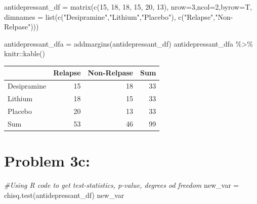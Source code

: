 \documentclass[
]{article}
\newenvironment{Shaded}{\begin{snugshade}}{\end{snugshade}}
\newcommand{\AttributeTok}[1]{\textcolor[rgb]{0.77,0.63,0.00}{#1}}
\newcommand{\CommentTok}[1]{\textcolor[rgb]{0.56,0.35,0.01}{\textit{#1}}}
\newcommand{\DecValTok}[1]{\textcolor[rgb]{0.00,0.00,0.81}{#1}}
\newcommand{\FunctionTok}[1]{\textcolor[rgb]{0.00,0.00,0.00}{#1}}
\newcommand{\NormalTok}[1]{#1}
\newcommand{\OtherTok}[1]{\textcolor[rgb]{0.56,0.35,0.01}{#1}}
\newcommand{\SpecialCharTok}[1]{\textcolor[rgb]{0.00,0.00,0.00}{#1}}
\newcommand{\StringTok}[1]{\textcolor[rgb]{0.31,0.60,0.02}{#1}}
\begin{document}
\begin{Shaded}
\begin{Highlighting}[]
\NormalTok{antidepressant\_df }\OtherTok{=} \FunctionTok{matrix}\NormalTok{(}\FunctionTok{c}\NormalTok{(}\DecValTok{15}\NormalTok{, }\DecValTok{18}\NormalTok{, }\DecValTok{18}\NormalTok{, }\DecValTok{15}\NormalTok{, }\DecValTok{20}\NormalTok{, }\DecValTok{13}\NormalTok{), }\AttributeTok{nrow=}\DecValTok{3}\NormalTok{,}\AttributeTok{ncol=}\DecValTok{2}\NormalTok{,}\AttributeTok{byrow=}\NormalTok{T,}
                  \AttributeTok{dimnames =} \FunctionTok{list}\NormalTok{(}\FunctionTok{c}\NormalTok{(}\StringTok{"Desipramine"}\NormalTok{,}\StringTok{"Lithium"}\NormalTok{,}\StringTok{"Placebo"}\NormalTok{), }
                                  \FunctionTok{c}\NormalTok{(}\StringTok{"Relapse"}\NormalTok{,}\StringTok{"Non{-}Relpase"}\NormalTok{)))}

\NormalTok{antidepressant\_dfa }\OtherTok{=} \FunctionTok{addmargins}\NormalTok{(antidepressant\_df)}
\NormalTok{antidepressant\_dfa }\SpecialCharTok{\%\textgreater{}\%}\NormalTok{ knitr}\SpecialCharTok{::}\FunctionTok{kable}\NormalTok{()}
\end{Highlighting}
\end{Shaded}

\begin{longtable}[]{@{}lrrr@{}}
\toprule
& Relapse & Non-Relpase & Sum \\
\midrule
\endhead
Desipramine & 15 & 18 & 33 \\
Lithium & 18 & 15 & 33 \\
Placebo & 20 & 13 & 33 \\
Sum & 53 & 46 & 99 \\
\bottomrule
\end{longtable}

\newpage

\hypertarget{problem-3c}{%
\section{Problem 3c:}\label{problem-3c}}

\begin{Shaded}
\begin{Highlighting}[]
\CommentTok{\#Using R code to get test{-}statistics, p{-}value, degrees od freedom}
\NormalTok{new\_var }\OtherTok{=} \FunctionTok{chisq.test}\NormalTok{(antidepressant\_df)}
\NormalTok{new\_var}
\end{Highlighting}
\end{Shaded}
\end{document}
